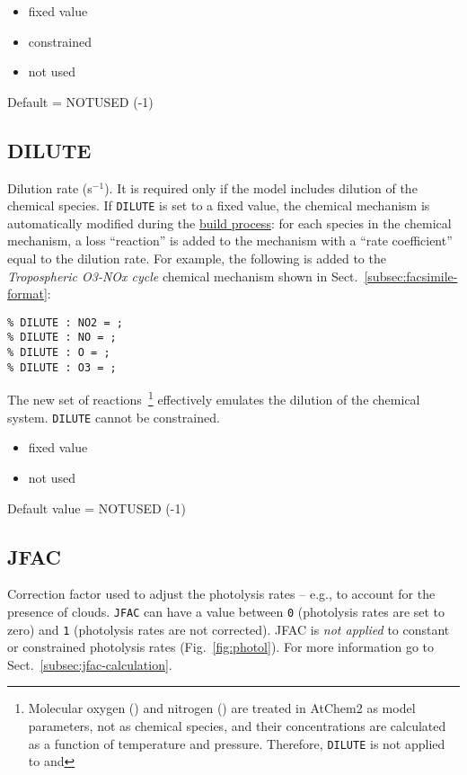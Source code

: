 \begin{itemize}
\item fixed value
\item constrained
\item not used
\end{itemize}

Default = NOTUSED (-1)

\subsection{DILUTE} \label{subsec:dilute}

Dilution rate (s$^{-1}$). It is required only if the model includes
dilution of the chemical species. If \texttt{DILUTE} is set to a fixed
value, the chemical mechanism is automatically modified during the
\hyperref[subsec:build-process]{build process}: for each species in
the chemical mechanism, a loss ``reaction'' is added to the mechanism
with a ``rate coefficient'' equal to the dilution rate. For example,
the following is added to the \emph{Tropospheric O3-NOx cycle}
chemical mechanism shown in Sect.~\ref{subsec:facsimile-format}:

\begin{verbatim}
% DILUTE : NO2 = ;                  
% DILUTE : NO = ;
% DILUTE : O = ;
% DILUTE : O3 = ;
\end{verbatim}

The new set of reactions~\footnote{Molecular oxygen () and
  nitrogen () are treated in AtChem2 as model parameters, not
  as chemical species, and their concentrations are calculated as a
  function of temperature and pressure. Therefore, \texttt{DILUTE} is
  not applied to  and } effectively emulates the
dilution of the chemical system. \texttt{DILUTE} cannot be
constrained.

\begin{itemize}
\item fixed value
\item not used
\end{itemize}

Default value = NOTUSED (-1)

\subsection{JFAC} \label{subsec:jfac}

Correction factor used to adjust the photolysis rates -- e.g., to
account for the presence of clouds. \texttt{JFAC} can have a value
between \texttt{0} (photolysis rates are set to zero) and \texttt{1}
(photolysis rates are not corrected). JFAC is \emph{not applied} to
constant or constrained photolysis rates (Fig.~\ref{fig:photol}). For
more information go to Sect.~\ref{subsec:jfac-calculation}.

